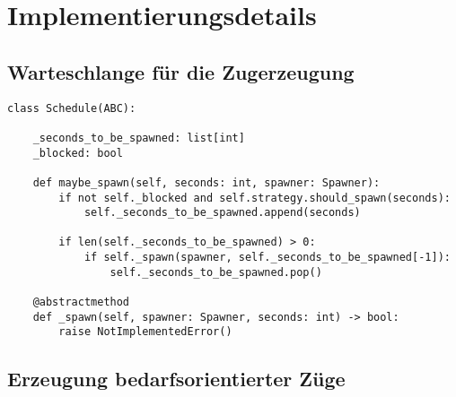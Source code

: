 \section{Implementierungsdetails}

\subsection{Warteschlange für die Zugerzeugung}

\lstset{language=python}
\begin{lstlisting}[caption={Quelltextunterschrift}, label=code:template-method-code]
class Schedule(ABC):

    _seconds_to_be_spawned: list[int]
    _blocked: bool

    def maybe_spawn(self, seconds: int, spawner: Spawner):
        if not self._blocked and self.strategy.should_spawn(seconds):
            self._seconds_to_be_spawned.append(seconds)

        if len(self._seconds_to_be_spawned) > 0:
            if self._spawn(spawner, self._seconds_to_be_spawned[-1]):
                self._seconds_to_be_spawned.pop()

    @abstractmethod
    def _spawn(self, spawner: Spawner, seconds: int) -> bool:
    	raise NotImplementedError()
\end{lstlisting}

\subsection{Erzeugung bedarfsorientierter Züge}

